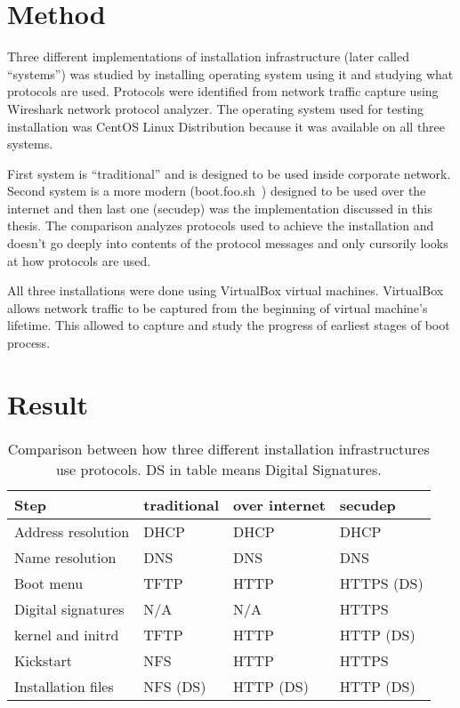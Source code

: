 
\section{Method}

Three different implementations of installation infrastructure (later
called ``systems'') was studied by installing operating system using
it and studying what protocols are used. Protocols were identified
from network traffic capture using Wireshark network protocol
analyzer. The operating system used for testing installation was
CentOS Linux Distribution because it was available on all three
systems.

First system is ``traditional'' and is designed to be used inside
corporate network. Second system is a more modern
(boot.foo.sh~\cite{boot-foo-sh}) designed to be used over the internet
and then last one (secudep) was the implementation discussed in this
thesis. The comparison analyzes protocols used to achieve the
installation and doesn't go deeply into contents of the protocol
messages and only cursorily looks at how protocols are used.

All three installations were done using VirtualBox virtual
machines. VirtualBox allows network traffic to be captured from the
beginning of virtual machine's lifetime. This allowed to capture
and study the progress of earliest stages of boot process.

\section{Result}

\begin{table}[!ht]
  \def\arraystretch{1.1}%
  \begin{center}
    \begin{tabular}{| l | l | l | l |}
      \hline
      Step               & traditional & over internet & secudep    \\
      \hline
      Address resolution & DHCP        & DHCP          & DHCP       \\
      Name resolution    & DNS         & DNS           & DNS        \\
      Boot menu          & TFTP        & HTTP          & HTTPS (DS) \\
      Digital signatures & N/A         & N/A           & HTTPS      \\
      kernel and initrd  & TFTP        & HTTP          & HTTP (DS)  \\
      Kickstart          & NFS         & HTTP          & HTTPS      \\
      Installation files & NFS (DS)    & HTTP (DS)     & HTTP (DS)  \\
      \hline
    \end{tabular}
    \caption{Comparison between how three different installation
      infrastructures use protocols. DS in table means Digital
      Signatures.\label{tab:comparison_table}}
  \end{center}
\end{table}

